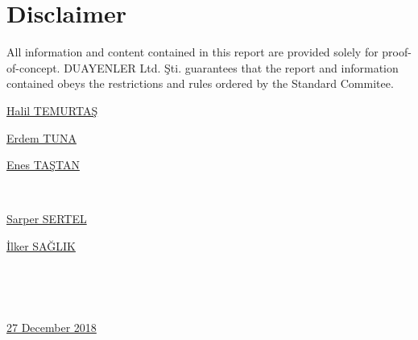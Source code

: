 \documentclass[a4paper,12pt]{article}
\begin{document}
	\newpage
\begin{appendices}
	
		
		

	
\end{appendices}

	
	
	\newpage
	\section{Disclaimer}
	\vspace{1cm}
	
	\textsf{ All information and content contained in this report are provided solely for proof-of-concept. DUAYENLER Ltd. Şti. guarantees that the report and information contained obeys the restrictions and rules ordered by the Standard Commitee.}
	
	\vspace{1cm}
	

\begin{minipage}[b]{0.33\linewidth}
\centering
\underline{Halil TEMURTAŞ}
\end{minipage}%
\begin{minipage}[b]{0.33\linewidth}
\centering
\underline{Erdem TUNA}
\end{minipage}%
\begin{minipage}[b]{0.33\linewidth}
\centering
\underline{Enes TAŞTAN}
\end{minipage} \\[2.5cm]

\begin{minipage}[b]{0.495\linewidth}
\centering
\underline{Sarper SERTEL}
\end{minipage}%
\begin{minipage}[b]{0.495\linewidth}
\centering
\underline{İlker SAĞLIK}
\end{minipage}\\[2.5cm]

\begin{minipage}[b]{0.745\linewidth}
\centering
~~
\end{minipage}%
\begin{minipage}[b]{0.25\linewidth}
\centering
\underline{27 December 2018}
\end{minipage}



	
	
	
\end{document}
